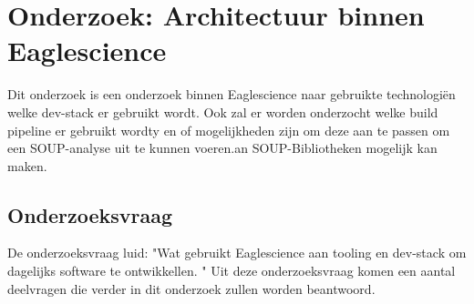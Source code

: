
\chapter{Onderzoek: Architectuur binnen Eaglescience} %

\label{OnderzoekArchituur} %
Dit onderzoek is een onderzoek binnen Eaglescience naar gebruikte technologi\"en welke dev-stack er gebruikt wordt. Ook zal er worden onderzocht welke build pipeline er gebruikt wordty en of mogelijkheden zijn om deze aan te passen om een SOUP-analyse uit te kunnen voeren.an SOUP-Bibliotheken mogelijk kan maken.
\section{Onderzoeksvraag}
De onderzoeksvraag luid: "Wat gebruikt Eaglescience aan tooling en dev-stack om dagelijks software te ontwikkellen. "
Uit deze onderzoeksvraag komen een aantal deelvragen die verder in dit onderzoek zullen worden beantwoord.

